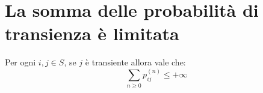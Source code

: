 \documentclass[\main/main.tex]{subfiles}
\begin{document}
\section{La somma delle probabilità di transienza è limitata}
\begin{observation}
  Per ogni \(i,j \in S\), se \(j\) è transiente allora vale che:
  \[
    \sum_{n \geq 0}p^{(n)}_{ij} \leq +\infty
  \]
\end{observation}
\end{document}
